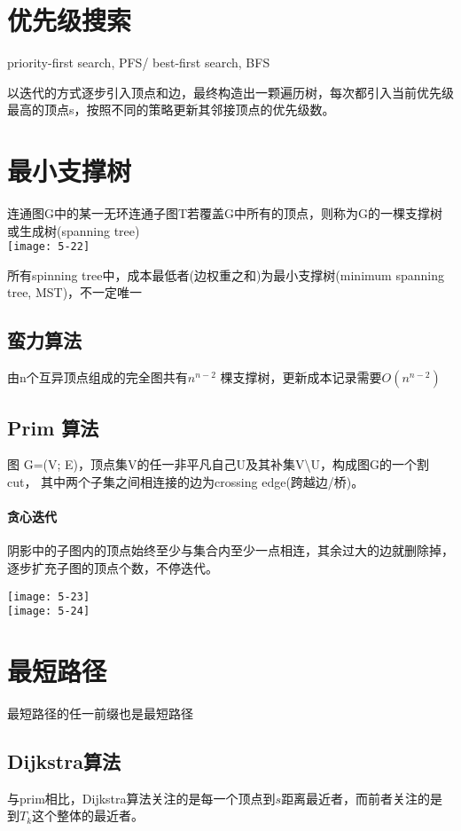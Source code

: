 \section{优先级搜索}
priority-first search, PFS/ best-first search, BFS

以迭代的方式逐步引入顶点和边，最终构造出一颗遍历树，每次都引入当前优先级最高的顶点s，按照不同的策略更新其邻接顶点的优先级数。

\section{最小支撑树}
连通图G中的某一无环连通子图T若覆盖G中所有的顶点，则称为G的一棵支撑树或生成树(spanning tree)\\
\texttt{[image: 5-22]}
 
所有spinning tree中，成本最低者(边权重之和)为最小支撑树(minimum spanning tree, MST)，不一定唯一

\subsection{蛮力算法}
由n个互异顶点组成的完全图共有$n^{n-2}$ 棵支撑树，更新成本记录需要$O(n^{n-2})$

\subsection{Prim 算法}
图 G=(V; E)，顶点集V的任一非平凡自己U及其补集V\backslash U，构成图G的一个割cut， 其中两个子集之间相连接的边为crossing edge(跨越边/桥)。

\paragraph{贪心迭代}
阴影中的子图内的顶点始终至少与集合内至少一点相连，其余过大的边就删除掉，逐步扩充子图的顶点个数，不停迭代。

\texttt{[image: 5-23]}\\
\texttt{[image: 5-24]}

\section{最短路径}
最短路径的任一前缀也是最短路径

\subsection{Dijkstra算法}
与prim相比，Dijkstra算法关注的是每一个顶点到$s$距离最近者，而前者关注的是到$T_k$这个整体的最近者。

